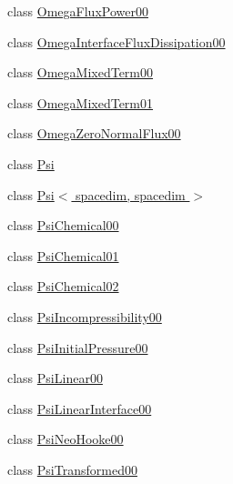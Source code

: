 \begin{DoxyCompactItemize}
class \hyperlink{classincremental_f_e_1_1_omega_flux_power00}{Omega\+Flux\+Power00}
\item 
class \hyperlink{classincremental_f_e_1_1_omega_interface_flux_dissipation00}{Omega\+Interface\+Flux\+Dissipation00}
\item 
class \hyperlink{classincremental_f_e_1_1_omega_mixed_term00}{Omega\+Mixed\+Term00}
\item 
class \hyperlink{classincremental_f_e_1_1_omega_mixed_term01}{Omega\+Mixed\+Term01}
\item 
class \hyperlink{classincremental_f_e_1_1_omega_zero_normal_flux00}{Omega\+Zero\+Normal\+Flux00}
\item 
class \hyperlink{classincremental_f_e_1_1_psi}{Psi}
\item 
class \hyperlink{classincremental_f_e_1_1_psi_3_01spacedim_00_01spacedim_01_4}{Psi$<$ spacedim, spacedim $>$}
\item 
class \hyperlink{classincremental_f_e_1_1_psi_chemical00}{Psi\+Chemical00}
\item 
class \hyperlink{classincremental_f_e_1_1_psi_chemical01}{Psi\+Chemical01}
\item 
class \hyperlink{classincremental_f_e_1_1_psi_chemical02}{Psi\+Chemical02}
\item 
class \hyperlink{classincremental_f_e_1_1_psi_incompressibility00}{Psi\+Incompressibility00}
\item 
class \hyperlink{classincremental_f_e_1_1_psi_initial_pressure00}{Psi\+Initial\+Pressure00}
\item 
class \hyperlink{classincremental_f_e_1_1_psi_linear00}{Psi\+Linear00}
\item 
class \hyperlink{classincremental_f_e_1_1_psi_linear_interface00}{Psi\+Linear\+Interface00}
\item 
class \hyperlink{classincremental_f_e_1_1_psi_neo_hooke00}{Psi\+Neo\+Hooke00}
\item 
class \hyperlink{classincremental_f_e_1_1_psi_transformed00}{Psi\+Transformed00}
\end{DoxyCompactItemize}
